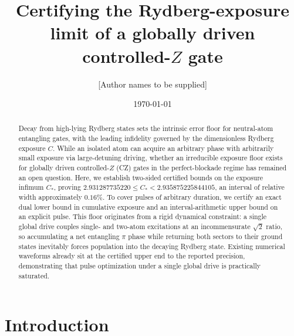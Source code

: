 \documentclass[aps,prx,reprint,nofootinbib,longbibliography,floatfix]{revtex4-2}
\theoremstyle{plain}
\theoremstyle{remark}
\begin{document}
\title{Certifying the Rydberg-exposure limit of a globally driven controlled-$Z$ gate}
\author{[Author names to be supplied]}
\date{\today}

\begin{abstract}
Decay from high-lying Rydberg states sets the intrinsic error floor for neutral-atom entangling gates, with the leading infidelity governed by the dimensionless Rydberg exposure $C$. While an isolated atom can acquire an arbitrary phase with arbitrarily small exposure via large-detuning driving, whether an irreducible exposure floor exists for globally driven controlled-$Z$ (CZ) gates in the perfect-blockade regime has remained an open question. Here, we establish two-sided certified bounds on the exposure infimum $C_*$, proving $2.931287735220 \le C_* < 2.935875225844105$, an interval of relative width approximately $0.16\%$. To cover pulses of arbitrary duration, we certify an exact dual lower bound in cumulative exposure and an interval-arithmetic upper bound on an explicit pulse. This floor originates from a rigid dynamical constraint: a single global drive couples single- and two-atom excitations at an incommensurate $\sqrt{2}$ ratio, so accumulating a net entangling $\pi$ phase while returning both sectors to their ground states inevitably forces population into the decaying Rydberg state. Existing numerical waveforms already sit at the certified upper end to the reported precision, demonstrating that pulse optimization under a single global drive is practically saturated.
\end{abstract}
\maketitle

\section{Introduction}
\label{sec:intro}
\end{document}

